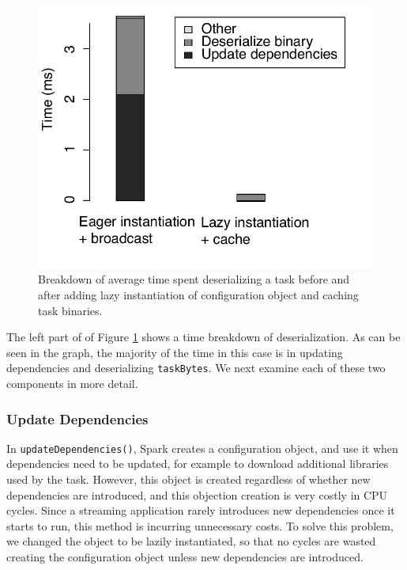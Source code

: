 \begin{figure}[t!]
 \begin{center}
   \includegraphics[scale=0.60]{images_graphs/optimizations/graph2/task_deser_micro_illus.pdf}
 \end{center}
 \caption{Breakdown of average time spent deserializing a task before and after adding lazy instantiation of configuration object and caching task binaries.}
 \label{fig:deserialization_times}
\end{figure}

The left part of of Figure \ref{fig:deserialization_times} shows a time breakdown of deserialization. As can be seen in the graph, the majority of the time in this case is in updating dependencies and deserializing \texttt{taskBytes}. We next examine each of these two components in more detail.

\subsubsection{Update Dependencies}
In \texttt{updateDependencies()}, Spark creates a configuration object, and use it when dependencies need to be updated, for example to download additional libraries used by the task. However, this object is created regardless of whether new dependencies are introduced, and this objection creation is very costly in CPU cycles. Since a streaming application rarely introduces new dependencies once it starts to run, this method is incurring unnecessary costs. To solve this problem, we changed the object to be lazily instantiated, so that no cycles are wasted creating the configuration object unless new dependencies are introduced.

